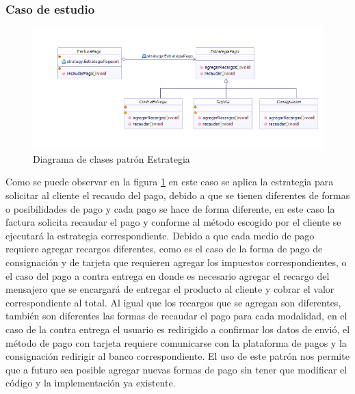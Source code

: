 \subsubsection{Caso de estudio}

\begin{figure}[th!]
	\centering
	\includegraphics[width=1.0\linewidth]{arquitectura/imagenes/DiagramaEstrategia}
	\caption{Diagrama de clases patrón Estrategia}
	\label{fig:patronEstrategia}
\end{figure}


Como se puede observar en la figura \ref{fig:patronEstrategia} en este caso se aplica la estrategia para solicitar al cliente el recaudo del pago, debido a que se tienen diferentes de formas o posibilidades de pago y cada pago se hace de forma diferente, en este caso la factura solicita recaudar el  pago y conforme al método escogido por el cliente se ejecutará la estrategia correspondiente.\newline
Debido a que cada medio de pago requiere agregar recargos diferentes, como es el caso de la forma de pago de consignación y de tarjeta que requieren agregar los impuestos correspondientes, o el caso del pago a contra entrega en donde es necesario agregar el recargo del mensajero que se encargará de entregar el producto al cliente y cobrar el valor correspondiente al total.\newline
Al igual que los recargos que se agregan son diferentes, también son diferentes las formas de recaudar el pago para cada modalidad, en el caso de la contra entrega el usuario es redirigido a confirmar los datos de envió, el método de pago con tarjeta requiere comunicarse con la plataforma de pagos y la consignación redirigir al banco correspondiente.\newline
El uso de este patrón nos permite que a futuro sea posible agregar nuevas formas de pago sin tener que modificar el código y la implementación ya existente.





